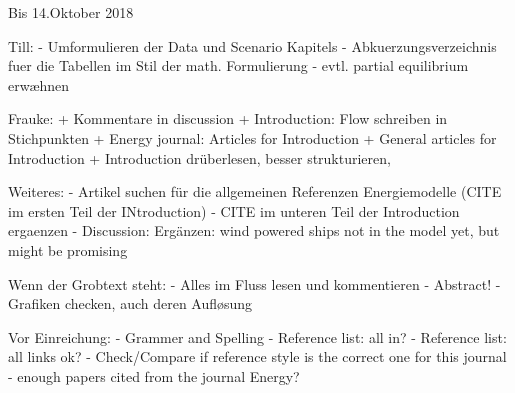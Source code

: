 Bis 14.Oktober 2018

Till:
- Umformulieren der Data und Scenario Kapitels
- Abkuerzungsverzeichnis fuer die Tabellen im Stil der math. Formulierung
- evtl. partial equilibrium erwæhnen

Frauke:
+ Kommentare in discussion
+ Introduction: Flow schreiben in Stichpunkten
+ Energy journal: Articles for Introduction
+ General articles for Introduction
+ Introduction drüberlesen, besser strukturieren, 

Weiteres:
- Artikel suchen für die allgemeinen Referenzen Energiemodelle (CITE im ersten Teil der INtroduction)
- CITE im unteren Teil der Introduction ergaenzen
- Discussion: Ergänzen: wind powered ships not in the model yet, but might be promising

Wenn der Grobtext steht:
- Alles im Fluss lesen und kommentieren
- Abstract!
- Grafiken checken, auch deren Aufløsung


Vor Einreichung:
- Grammer and Spelling
- Reference list: all in?
- Reference list: all links ok?
- Check/Compare if reference style is the correct one for this journal
- enough papers cited from the journal Energy?

